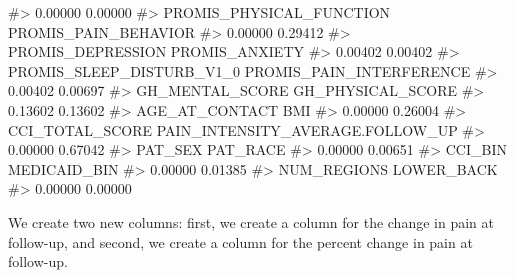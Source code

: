 \documentclass[
  letterpaper,
]{latex/krantz}
\makeatletter
\newenvironment{Shaded}{\begin{snugshade}}{\end{snugshade}}
\newcommand{\CommentTok}[1]{\textcolor[rgb]{0.37,0.37,0.37}{#1}}
\newcommand{\FunctionTok}[1]{\textcolor[rgb]{0.28,0.35,0.67}{#1}}
\newcommand{\NormalTok}[1]{\textcolor[rgb]{0.00,0.23,0.31}{#1}}
\newcommand{\OtherTok}[1]{\textcolor[rgb]{0.00,0.23,0.31}{#1}}
\newcommand{\SpecialCharTok}[1]{\textcolor[rgb]{0.37,0.37,0.37}{#1}}
\newenvironment{kframe}{%
\medskip{}
\setlength{\fboxsep}{.8em}
 \def\at@end@of@kframe{}%
 \ifinner\ifhmode%
  \def\at@end@of@kframe{\end{minipage}}%
  \begin{minipage}{\columnwidth}%
 \fi\fi%
 \def\FrameCommand##1{\hskip\@totalleftmargin \hskip-\fboxsep
 \colorbox{shadecolor}{##1}\hskip-\fboxsep
     \hskip-\linewidth \hskip-\@totalleftmargin \hskip\columnwidth}%
 \MakeFramed {\advance\hsize-\width
   \@totalleftmargin\z@ \linewidth\hsize
   \@setminipage}}%
 {\par\unskip\endMakeFramed%
 \at@end@of@kframe}
\renewenvironment{Shaded}{\begin{kframe}}{\end{kframe}}
\makeatother
\begin{document}
\begin{Shaded}
\begin{Highlighting}[]
\CommentTok{\#\textgreater{}                          0.00000                          0.00000 }
\CommentTok{\#\textgreater{}         PROMIS\_PHYSICAL\_FUNCTION             PROMIS\_PAIN\_BEHAVIOR }
\CommentTok{\#\textgreater{}                          0.00000                          0.29412 }
\CommentTok{\#\textgreater{}                PROMIS\_DEPRESSION                   PROMIS\_ANXIETY }
\CommentTok{\#\textgreater{}                          0.00402                          0.00402 }
\CommentTok{\#\textgreater{}        PROMIS\_SLEEP\_DISTURB\_V1\_0         PROMIS\_PAIN\_INTERFERENCE }
\CommentTok{\#\textgreater{}                          0.00402                          0.00697 }
\CommentTok{\#\textgreater{}                  GH\_MENTAL\_SCORE                GH\_PHYSICAL\_SCORE }
\CommentTok{\#\textgreater{}                          0.13602                          0.13602 }
\CommentTok{\#\textgreater{}                   AGE\_AT\_CONTACT                              BMI }
\CommentTok{\#\textgreater{}                          0.00000                          0.26004 }
\CommentTok{\#\textgreater{}                  CCI\_TOTAL\_SCORE PAIN\_INTENSITY\_AVERAGE.FOLLOW\_UP }
\CommentTok{\#\textgreater{}                          0.00000                          0.67042 }
\CommentTok{\#\textgreater{}                          PAT\_SEX                         PAT\_RACE }
\CommentTok{\#\textgreater{}                          0.00000                          0.00651 }
\CommentTok{\#\textgreater{}                          CCI\_BIN                     MEDICAID\_BIN }
\CommentTok{\#\textgreater{}                          0.00000                          0.01385 }
\CommentTok{\#\textgreater{}                      NUM\_REGIONS                       LOWER\_BACK }
\CommentTok{\#\textgreater{}                          0.00000                          0.00000}
\end{Highlighting}
\end{Shaded}

We create two new columns: first, we create a column for the change in
pain at follow-up, and second, we create a column for the percent change
in pain at follow-up.

\begin{Shaded}
\end{Shaded}
\end{document}
